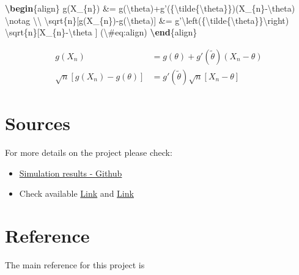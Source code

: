 \documentclass[]{book}
\newenvironment{Shaded}{\begin{snugshade}}{\end{snugshade}}
\newcommand{\ExtensionTok}[1]{#1}
\newcommand{\KeywordTok}[1]{\textcolor[rgb]{0.13,0.29,0.53}{\textbf{#1}}}
\newcommand{\NormalTok}[1]{#1}
\newcommand{\SpecialCharTok}[1]{\textcolor[rgb]{0.00,0.00,0.00}{#1}}
\newcommand{\SpecialStringTok}[1]{\textcolor[rgb]{0.31,0.60,0.02}{#1}}
\theoremstyle{definition}
\theoremstyle{definition}
\theoremstyle{definition}
\theoremstyle{remark}
\begin{document}
\begin{Shaded}
\begin{Highlighting}[]
\KeywordTok{\textbackslash{}begin}\NormalTok{\{}\ExtensionTok{align}\NormalTok{\}}\SpecialStringTok{ }
\SpecialStringTok{g(X_\{n\}) &= g(}\SpecialCharTok{\textbackslash{}theta}\SpecialStringTok{)+g'(\{}\SpecialCharTok{\textbackslash{}tilde}\SpecialStringTok{\{}\SpecialCharTok{\textbackslash{}theta}\SpecialStringTok{\}\})(X_\{n\}-}\SpecialCharTok{\textbackslash{}theta}\SpecialStringTok{) }\SpecialCharTok{\textbackslash{}notag}\SpecialStringTok{ }\SpecialCharTok{\textbackslash{}\textbackslash{}}
\SpecialCharTok{\textbackslash{}sqrt}\SpecialStringTok{\{n\}[g(X_\{n\})-g(}\SpecialCharTok{\textbackslash{}theta}\SpecialStringTok{)] &= g'}\SpecialCharTok{\textbackslash{}left}\SpecialStringTok{(\{}\SpecialCharTok{\textbackslash{}tilde}\SpecialStringTok{\{}\SpecialCharTok{\textbackslash{}theta}\SpecialStringTok{\}\}}\SpecialCharTok{\textbackslash{}right}\SpecialStringTok{)}
\SpecialStringTok{  }\SpecialCharTok{\textbackslash{}sqrt}\SpecialStringTok{\{n\}[X_\{n\}-}\SpecialCharTok{\textbackslash{}theta}\SpecialStringTok{ ] (}\SpecialCharTok{\textbackslash{}#}\SpecialStringTok{eq:align)}
\KeywordTok{\textbackslash{}end}\NormalTok{\{}\ExtensionTok{align}\NormalTok{\} }
\end{Highlighting}
\end{Shaded}

\begin{align}
g(X_{n}) &= g(\theta)+g'({\tilde{\theta}})(X_{n}-\theta)\\
\sqrt{n}[g(X_{n})-g(\theta)] &= g'\left({\tilde{\theta}}\right)
  \sqrt{n}[X_{n}-\theta ] \label{eq:align}
\end{align}

\hypertarget{sources-3}{%
\section*{Sources}\label{sources-3}}

For more details on the project please check:

\begin{itemize}
\item
  \href{https://github.com/aladinoster/density-reconstruction}{Simulation
  results - Github}
\item
  Check \autocite{Ladino2018} available
  \href{https://hal.archives-ouvertes.fr/hal-01731356}{Link} and
  \autocite{Lovisari2016}
  \href{https://hal.archives-ouvertes.fr/hal-01375928}{Link}
\end{itemize}

\hypertarget{reference}{%
\section*{Reference}\label{reference}}

The main reference for this project is \autocite{Ladino2018}

\printbibliography
\end{document}
